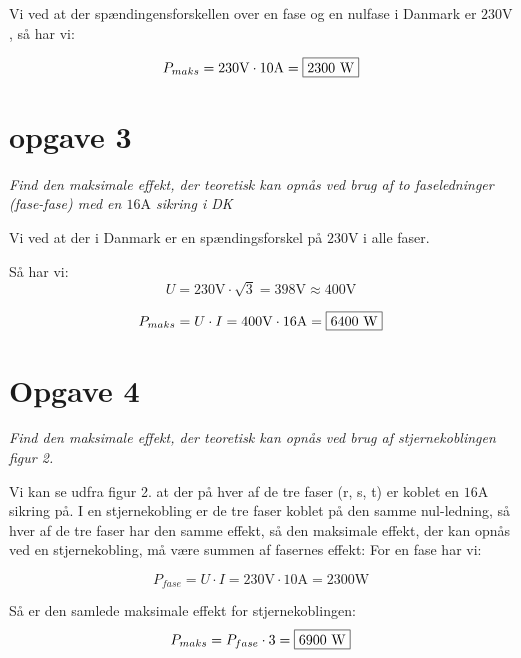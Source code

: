 \documentclass[a4paper, 12pt]{article}
\begin{document}
Vi ved at der spændingensforskellen over en fase og en nulfase i Danmark er \(230 \si{\V}\), så har vi:

\begin{equation*}
	P_{maks}=230 \si{\volt} \cdot 10 \si{\ampere} = \framebox{2300 \si{\watt}}
\end{equation*}

\section*{opgave 3}
\textit{Find den maksimale effekt, der teoretisk kan opnås ved brug af to faseledninger (fase-fase) med en \(16 \si{\ampere}\) sikring i DK} \newline

Vi ved at der i Danmark er en spændingsforskel på \(230 \si{\volt}\) i alle faser.

Så har vi:
\begin{equation*}
	U=230 \si{\volt} \cdot \sqrt{3} = 398 \si{\volt} \approx 400 \si{\volt}  
\end{equation*}

\begin{equation*}
	P_{maks}= U \cdot I = 400 \si{\volt} \cdot 16 \si{\ampere} = \framebox{6400 \si{\watt}}
\end{equation*}

\section*{Opgave 4}
\textit{Find den maksimale effekt, der teoretisk kan opnås ved brug af stjernekoblingen figur 2.} \newline

Vi kan se udfra figur 2. at der på hver af de tre faser (r, s, t) er koblet en \(16 \si{\ampere}\) sikring på. I en stjernekobling er de tre faser koblet på den samme nul-ledning, så hver af de tre faser har den samme effekt, så den maksimale effekt, der kan opnås ved en stjernekobling, må være summen af fasernes effekt: \newline 
For en fase har vi:

\begin{equation*}
	P_{fase} = U \cdot I = 230 \si{\volt} \cdot 10 \si{\ampere} = 2300 \si{\watt} 
\end{equation*}

Så er den samlede maksimale effekt for stjernekoblingen:
\begin{equation*}
	P_{maks} = P_{fase} \cdot 3 = \framebox{6900 \si{\watt}}
\end{equation*}
\end{document}
